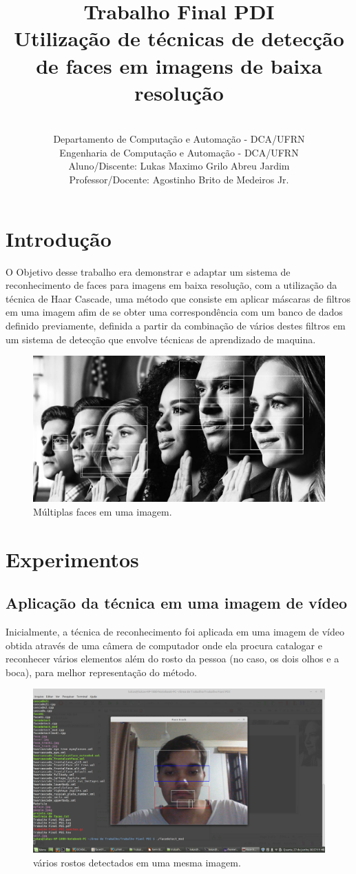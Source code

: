 \documentclass{article}
\title{Trabalho Final PDI\\
Utilização de técnicas de detecção de faces em imagens de baixa resolução\\}
\author{\\Departamento de Computação e Automação - DCA/UFRN\\Engenharia de Computação e Automação - DCA/UFRN\\
	Aluno/Discente: Lukas Maximo Grilo Abreu Jardim\\Professor/Docente: Agostinho Brito de Medeiros Jr.}
\begin{document}
	\maketitle
	\newpage
	\section{Introdução}
	O Objetivo desse trabalho era demonstrar e adaptar um sistema de reconhecimento de faces para imagens em baixa resolução, com a utilização da técnica de Haar Cascade, uma método que consiste em aplicar máscaras de filtros em uma imagem afim de se obter uma correspondência com um banco de dados definido previamente, definida a partir da combinação de vários destes filtros em um sistema de detecção que envolve técnicas de aprendizado de maquina.
	
	\begin{figure}
		\centering
		\includegraphics[scale = 0.4]{Face_track2.jpg}
		\caption{Múltiplas faces em uma imagem.}
	\end{figure}
	\newpage
	\section{Experimentos}
	\subsection{Aplicação da técnica em uma imagem de vídeo}
	Inicialmente, a técnica de reconhecimento foi aplicada em uma imagem de vídeo obtida através de uma câmera de computador onde ela procura catalogar e reconhecer vários elementos além do rosto da pessoa (no caso, os dois olhos e a boca), para melhor representação do método.
	\begin{figure}
		\centering
		\includegraphics[scale = 0.3]{Capturadetela.png}
		\caption{vários rostos detectados em uma mesma imagem.}
	\end{figure}
	\newpage
\end{document}
